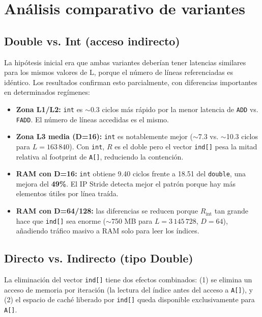 \documentclass[12pt,a4paper]{article}
\begin{document}
\section{Análisis comparativo de variantes}

\subsection{Double vs. Int (acceso indirecto)}

La hipótesis inicial era que ambas variantes deberían tener latencias similares para los mismos valores de L, porque el número de líneas referenciadas es idéntico. Los resultados confirman esto parcialmente, con diferencias importantes en determinados regímenes:

\begin{itemize}[leftmargin=1.5em]
  \item \textbf{Zona L1/L2:} \texttt{int} es $\sim$0.3 ciclos más rápido por la menor latencia de \texttt{ADD} vs. \texttt{FADD}. El número de líneas accedidas es el mismo.
  \item \textbf{Zona L3 media (D=16):} \texttt{int} es notablemente mejor ($\sim$7.3 vs. $\sim$10.3 ciclos para $L=163\,840$). Con \texttt{int}, $R$ es el doble pero el vector \texttt{ind[]} pesa la mitad relativa al footprint de \texttt{A[]}, reduciendo la contención.
  \item \textbf{RAM con D=16:} \texttt{int} obtiene 9.40 ciclos frente a 18.51 del \texttt{double}, una mejora del \textbf{49\%}. El IP Stride detecta mejor el patrón porque hay más elementos útiles por línea traída.
  \item \textbf{RAM con D=64/128:} las diferencias se reducen porque $R_\text{int}$ tan grande hace que \texttt{ind[]} sea enorme ($\sim$750 MB para $L=3\,145\,728$, $D=64$), añadiendo tráfico masivo a RAM solo para leer los índices.
\end{itemize}

\subsection{Directo vs. Indirecto (tipo Double)}

La eliminación del vector \texttt{ind[]} tiene dos efectos combinados: (1) se elimina un acceso de memoria por iteración (la lectura del índice antes del acceso a \texttt{A[]}), y (2) el espacio de caché liberado por \texttt{ind[]} queda disponible exclusivamente para \texttt{A[]}.
\end{document}
